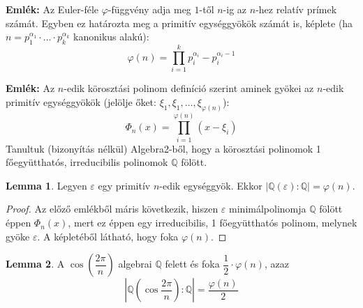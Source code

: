 \documentclass[12pt]{book}
\theoremstyle{plain} %
\theoremstyle{definition} %
\newtheorem{lem/}{Lemma}[section]
\newenvironment{lem}
  {\renewcommand{\qedsymbol}{$\clubsuit$}%
   \pushQED{\qed}\begin{lem/}}
  {\popQED\end{lem/}}
\theoremstyle{remark}
\renewcommand\qedsymbol{$\blacksquare$}
\numberwithin{equation}{section}  %
\begin{document}
	\textbf{Emlék:} Az Euler-féle $\varphi$-függvény adja meg $1$-től $n$-ig az $n$-hez relatív prímek számát. Egyben ez határozta meg a primitív egységgyökök számát is, képlete (ha $n=p_1^{\alpha_1}\cdot \ldots \cdot p_k^{\alpha_k}$ kanonikus alakú):
	\[ \varphi(n) = \prod_{i=1}^{k} p_i^{\alpha_i}-p_i^{\alpha_i-1}    \]
	
	\textbf{Emlék:} Az $n$-edik körosztási polinom definíció szerint aminek gyökei az $n$-edik primitív egységgyökök (jelölje őket: $\xi_1,\xi_1,\ldots,\xi_{\varphi(n)}$):
	\[ \varPhi_n(x) = \prod_{i=1}^{\varphi(n)} (x-\xi_i) \]
	Tanultuk (bizonyítás nélkül) Algebra2-ből, hogy a körosztási polinomok 1 főegyütthatós, irreducibilis polinomok $\mathbb{Q}$ fölött.

	\begin{lem}\label{negyseg}
		Legyen $\varepsilon$ egy primitív $n$-edik egységgyök. Ekkor $|\mathbb{Q}(\varepsilon):\mathbb{Q}| = \varphi(n)$.
	\end{lem}

	\begin{proof}
		Az előző emlékből máris következik, hiszen $\varepsilon$ minimálpolinomja $\mathbb{Q}$ fölött éppen $\varPhi_n(x)$, mert ez éppen egy irreducibilis, 1 főegyütthatós polinom, melynek gyöke $\varepsilon$. A képletéből látható, hogy foka $\varphi(n)$.
	\end{proof}

	\begin{lem}\label{egykettedfi}
		A $\cos\left(\dfrac{2\pi}{n}\right)$ algebrai $\mathbb{Q}$ felett és foka $\dfrac{1}{2}\cdot \varphi(n)$, azaz
		\[ \left|\mathbb{Q}\left(\cos \dfrac{2\pi}{n}\right):\mathbb{Q}\right| = \dfrac{\varphi(n)}{2}  \]
	\end{lem}
	
\end{document}
